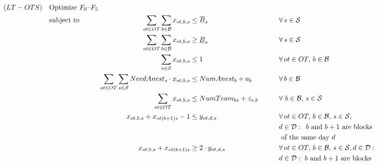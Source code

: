\begin{alignat}{4}
    (\modelname) \quad & \omit\rlap{Optimize $F_0$--$F_5$}\nonumber\\
    & \mbox{subject to} && \quad & \sum_{\roomidx \in \roomset} \sum_{\blockidx \in \blockset} \blockvar  & \leq \upperblockdemand                    &\qquad & \forall\, \specialtyidx \in \specialtyset  \label{eq:c1}\\
    &                  && \quad & \sum_{\roomidx \in \roomset} \sum_{\blockidx \in \blockset} \blockvar  & \geq \lowerblockdemand   &\qquad & \forall\, \specialtyidx \in \specialtyset \label{eq:c2}\\
    &                  && \quad & \sum_{\specialtyidx \in \specialtyset} \blockvar                       & \leq 1     &\qquad & \forall\, \roomidx \in \roomset,\, \blockidx \in \blockset \label{eq:c3}\\
    &                  && \quad & \sum_{\roomidx \in \roomset} \sum_{\specialtyidx \in \specialtyset} \needanest_{\specialtyidx} \cdot \blockvar   & \leq \numbersanests_{\blockidx} + \anestslackvar &\qquad & \forall\, \blockidx \in \blockset \label{eq:c4}\\
    &                  && \quad & \sum_{\roomidx \in \roomset} \blockvar   & \leq \specteams_{\blockidx\specialtyidx} + \teamslackvar  &\qquad & \forall\, \,\blockidx \in \blockset,\,\specialtyidx \in \specialtyset \label{eq:c5}\\
    &                  && \quad & \blockvar + x_{\roomidx(\blockidx+1)\specialtyidx} - 1   & \leq \precvar   &\qquad & \forall\, \roomidx \in \roomset,\, \blockidx \in \blockset,\,\specialtyidx \in \specialtyset, \nonumber\\
    &                  &&       &                                                          &                 &\qquad & \planninghorizonidx \in \planninghorizonset :\,\text{ $\blockidx$ and $\blockidx+1$ are blocks} \nonumber\\
    &                  &&       &                                                          &                 &\qquad & \text{ of the same day $\planninghorizonidx$}\label{eq:c6}\\
    &                  && \quad & \blockvar + x_{\roomidx(\blockidx+1)\specialtyidx}       & \geq 2 \cdot \precvar   &\qquad & \forall\, \roomidx \in \roomset,\, \blockidx \in \blockset,\,\specialtyidx \in \specialtyset, \planninghorizonidx \in \planninghorizonset : \nonumber\\
    &                  &&       &                                                          &                 &\qquad & \planninghorizonidx \in \planninghorizonset : \text{ $\blockidx$ and $\blockidx+1$ are blocks} \nonumber\\

\end{alignat}
